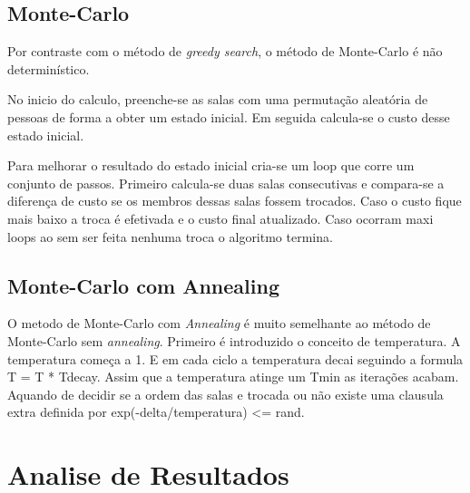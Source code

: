 \documentclass[a4paper]{report}
\begin{document}
\section{Monte-Carlo}

Por contraste com o método de \textit{greedy search}, o método de Monte-Carlo é
não determinístico.

No inicio do calculo, preenche-se as salas com uma permutação aleatória de
pessoas de forma a obter um estado inicial. Em seguida calcula-se o custo desse
estado inicial.

Para melhorar o resultado do estado inicial cria-se um loop que corre um
conjunto de passos. Primeiro calcula-se duas salas consecutivas e compara-se a
diferença de custo se os membros dessas salas fossem trocados. Caso o custo
fique mais baixo a troca é efetivada e o custo final atualizado. Caso ocorram
maxi loops ao sem ser feita nenhuma troca o algoritmo termina.

\section{Monte-Carlo com Annealing}

O metodo de Monte-Carlo com \textit{Annealing} é muito semelhante ao método de
Monte-Carlo sem \textit{annealing}. Primeiro é introduzido o conceito de
temperatura. A temperatura começa a 1. E em cada ciclo a temperatura decai
seguindo a formula T = T * Tdecay. Assim que a temperatura atinge um Tmin as
iterações acabam. Aquando de decidir se a ordem das salas e trocada ou não
existe uma clausula extra definida por exp(-delta/temperatura) <= rand.

\chapter{Analise de Resultados}
\end{document}
